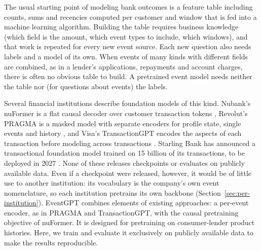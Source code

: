 \documentclass[12pt]{article}
\begin{document}
The usual starting point of modeling bank outcomes is a feature table including counts, sums and recencies computed per customer and window that is fed into a machine learning algorithm. Building the table requires business knowledge (which field is the amount, which event types to include, which windows), and that work is repeated for every new event source. Each new question also needs labels and a model of its own. When events of many kinds with different fields are combined, as in a lender's applications, repayments and account charges, there is often no obvious table to build. A pretrained event model needs neither the table nor (for questions about events) the labels.

Several financial institutions describe foundation models of this kind. Nubank's nuFormer is a flat
causal decoder over customer transaction tokens \cite{nuformer}, Revolut's PRAGMA is a masked model with separate encoders for profile state, single events and history \cite{pragma}, and Visa's TransactionGPT encodes the aspects of each transaction before modeling across transactions \cite{transactiongpt}. Starling Bank has announced a transactional foundation model trained on 15 billion of its transactions, to be deployed in 2027 \cite{starling}. None of these releases checkpoints or evaluates on publicly available data. Even if a checkpoint were released, however, it would be of little use to another institution: its vocabulary is the company's own event nomenclature, so each institution pretrains its own backbone (Section~\ref{sec:per-institution}). EventGPT combines elements of existing approaches: a per-event encoder, as in PRAGMA and TransactionGPT, with the causal pretraining objective of nuFormer. It is designed for pretraining on consumer-lender product histories. Here, we train and evaluate it exclusively on publicly available data to make the results reproducible.
\end{document}
